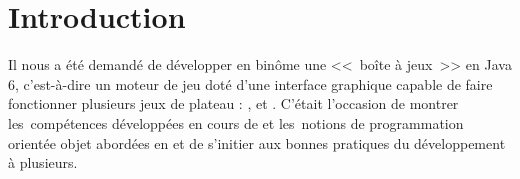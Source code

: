 \section{Introduction}
Il nous a été demandé de développer en binôme une <<~boîte à jeux~>> en Java 6, c'est-à-dire 
un moteur de jeu doté d'une interface graphique capable de faire fonctionner plusieurs jeux 
de plateau : \ttt{}, \cf{} et \oth. C'était l'occasion de montrer les~compétences développées 
en cours de  et les~notions de programmation orientée objet 
abordées en  et de s'initier aux bonnes pratiques du développement à plusieurs.